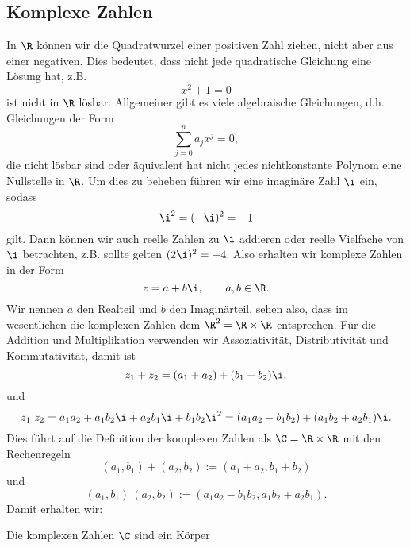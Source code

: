\documentclass[letterpaper,10pt,english]{jupyterBook}
\begin{document}
\subsection{Komplexe Zahlen}
\label{\detokenize{grundlagen/zahlensysteme:komplexe-zahlen}}
In \(\R\) können wir die Quadratwurzel einer positiven Zahl ziehen, nicht aber aus einer negativen. Dies bedeutet, dass nicht jede quadratische Gleichung eine Lösung hat, z.B.
\begin{equation*}
 x^2 +1 = 0
\end{equation*}
ist nicht in \(\R\) lösbar. Allgemeiner gibt es viele algebraische Gleichungen, d.h. Gleichungen der Form
\begin{equation*}
 \sum_{j=0}^n a_j x^j = 0,
\end{equation*}
die nicht lösbar sind oder äquivalent hat nicht jedes nichtkonstante Polynom eine Nullstelle in \(\R\). Um dies zu beheben führen wir eine imaginäre Zahl \(\i\) ein, sodass
\begin{equation*}
 \i^2 = (-\i)^2 = -1
\end{equation*}
gilt. Dann können wir auch reelle Zahlen zu \(\i\) addieren oder reelle Vielfache von \(\i\) betrachten, z.B. sollte gelten \((2\i)^2=-4\). Also erhalten wir komplexe Zahlen in der Form
\begin{equation*}
 z = a + b \i, \qquad a, b \in \R.
\end{equation*}
Wir nennen \(a\) den Realteil und \(b\) den Imaginärteil, sehen also, dass im wesentlichen die komplexen Zahlen dem \(\R^2 = \R \times \R\) entsprechen.
Für die Addition und Multiplikation verwenden wir Assoziativität, Distributivität und Kommutativität, damit ist
\begin{equation*}
 z_1+z_2 = (a_1+a_2) + (b_1+b_2)\i,
\end{equation*}
und
\begin{equation*}
 z_1 ~z_2 = a_1 a_2 + a_1 b_2 \i + a_2 b_1 \i + b_1 b_2 \i^2 = (a_1 a_2 - b_1 b_2) + ( a_1 b_2   + a_2 b_1) \i .
\end{equation*}
Dies führt auf die Definition der komplexen Zahlen als \(\C = \R \times \R\) mit den Rechenregeln
\begin{equation*}
 (a_1,b_1) +(a_2,b_2) := (a_1+a_2,b_1+b_2)
\end{equation*}
und
\begin{equation*}
 (a_1,b_1) ~(a_2,b_2) := (a_1 a_2 - b_1 b_2,a_1 b_2   + a_2 b_1).
\end{equation*}
Damit erhalten wir:
\label{grundlagen/zahlensysteme:theorem-29}
\begin{theorem}{}{}



Die komplexen Zahlen \(\C\) sind ein Körper
\end{theorem}
\end{document}
